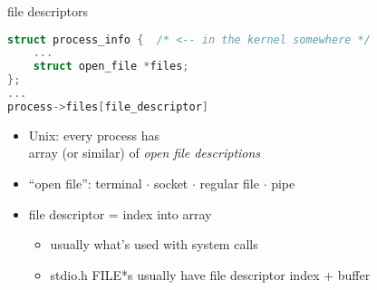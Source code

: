 \begin{frame}[fragile,label=fds]{file descriptors}
\begin{lstlisting}[language=C,style=smaller]
struct process_info {  /* <-- in the kernel somewhere */
    ...
    struct open_file *files;
};
...
process->files[file_descriptor]
\end{lstlisting}
    \begin{itemize}
    \item Unix: every process has \\
        array (or similar) of \textit{open file descriptions}
    \item ``open file'': \small terminal $\cdot$ socket $\cdot$ regular file $\cdot$ pipe
    \item file descriptor = index into array
        \begin{itemize}
        \item usually what's used with system calls
        \item stdio.h FILE*s usually have file descriptor index + buffer
        \end{itemize}
    \end{itemize}
\end{frame}


